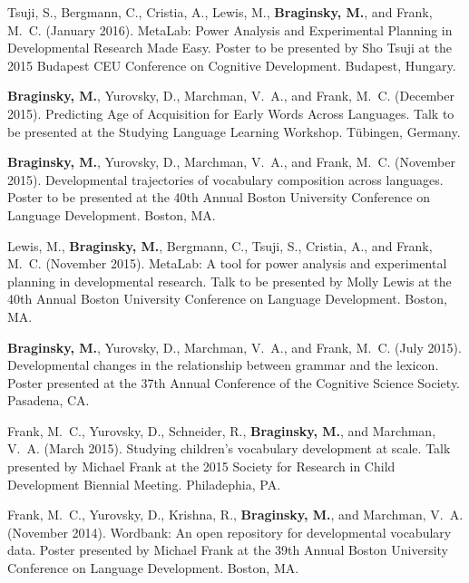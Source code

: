 \documentclass[11pt,letter]{moderncv}
\begin{document}
\begin{small}
\begin{thebibliography}{}

Tsuji, S., Bergmann, C., Cristia, A., Lewis, M., \textbf{Braginsky, M.}, and Frank, M.~C. (January 2016).
\newblock MetaLab: Power Analysis and Experimental Planning in Developmental Research Made Easy.
\newblock Poster to be presented by Sho Tsuji at the 2015 Budapest CEU Conference on Cognitive Development.
  Budapest, Hungary.

\textbf{Braginsky, M.}, Yurovsky, D., Marchman, V.~A., and Frank, M.~C. (December 2015).
\newblock Predicting Age of Acquisition for Early Words Across Languages.
\newblock Talk to be presented at the Studying Language Learning Workshop.
  T{\"u}bingen, Germany.
  
\textbf{Braginsky, M.}, Yurovsky, D., Marchman, V.~A., and Frank, M.~C. (November 2015).
\newblock Developmental trajectories of vocabulary composition across languages.
\newblock Poster to be presented at the 40th Annual Boston University
  Conference on Language Development.
  Boston, MA.
  
Lewis, M., \textbf{Braginsky, M.}, Bergmann, C., Tsuji, S., Cristia, A., and Frank, M.~C. (November 2015).
\newblock MetaLab: A tool for power analysis and experimental planning in developmental research.
\newblock Talk to be presented by Molly Lewis at the 40th Annual Boston University
  Conference on Language Development.
  Boston, MA.
  
\textbf{Braginsky, M.}, Yurovsky, D., Marchman, V.~A., and Frank, M.~C. (July 2015).
\newblock Developmental changes in the relationship between grammar and the
  lexicon.
\newblock Poster presented at the 37th Annual Conference of the Cognitive Science Society.
  Pasadena, CA.

Frank, M.~C., Yurovsky, D., Schneider, R., \textbf{Braginsky, M.}, and Marchman, V.~A. (March 2015).
\newblock Studying children's vocabulary development at scale.
\newblock Talk presented by Michael Frank at the 2015 Society for Research in Child
  Development Biennial Meeting.
  Philadephia, PA.

Frank, M.~C., Yurovsky, D., Krishna, R., \textbf{Braginsky, M.}, and Marchman, V.~A. (November 2014).
\newblock Wordbank: An open repository for developmental vocabulary data.
\newblock Poster presented by Michael Frank at the 39th Annual Boston University
  Conference on Language Development.
  Boston, MA.
 
\end{thebibliography}
\end{small}
\end{document}
